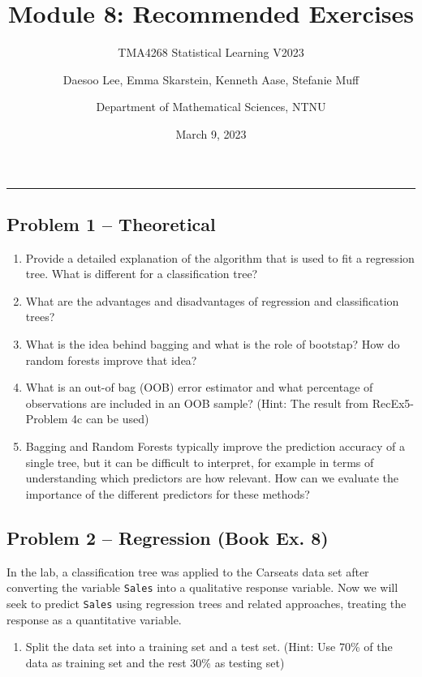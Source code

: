 \documentclass[
]{article}
\title{Module 8: Recommended Exercises}
\subtitle{TMA4268 Statistical Learning V2023}
\author{Daesoo Lee, Emma Skarstein, Kenneth Aase, Stefanie
Muff \and Department of Mathematical Sciences, NTNU}
\date{March 9, 2023}
\providecommand{\tightlist}{%
  \setlength{\itemsep}{0pt}\setlength{\parskip}{0pt}}
\begin{document}
\maketitle

\begin{center}\rule{0.5\linewidth}{0.5pt}\end{center}

\hypertarget{problem-1-theoretical}{%
\subsection{Problem 1 -- Theoretical}\label{problem-1-theoretical}}

\begin{enumerate}
\def\labelenumi{\alph{enumi})}
\item
  Provide a detailed explanation of the algorithm that is used to fit a
  regression tree. What is different for a classification tree?
\item
  What are the advantages and disadvantages of regression and
  classification trees?
\item
  What is the idea behind bagging and what is the role of bootstap? How
  do random forests improve that idea?
\item
  What is an out-of bag (OOB) error estimator and what percentage of
  observations are included in an OOB sample? (Hint: The result from
  RecEx5-Problem 4c can be used)
\item
  Bagging and Random Forests typically improve the prediction accuracy
  of a single tree, but it can be difficult to interpret, for example in
  terms of understanding which predictors are how relevant. How can we
  evaluate the importance of the different predictors for these methods?
\end{enumerate}

\hypertarget{problem-2-regression-book-ex.-8}{%
\subsection{Problem 2 -- Regression (Book Ex.
8)}\label{problem-2-regression-book-ex.-8}}

In the lab, a classification tree was applied to the Carseats data set
after converting the variable \texttt{Sales} into a qualitative response
variable. Now we will seek to predict \texttt{Sales} using regression
trees and related approaches, treating the response as a quantitative
variable.

\begin{enumerate}
\def\labelenumi{\alph{enumi})}
\tightlist
\item
  Split the data set into a training set and a test set. (Hint: Use 70\%
  of the data as training set and the rest 30\% as testing set)
\end{enumerate}
\end{document}
